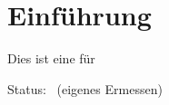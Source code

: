 \documentclass[12pt,a4paper,ngerman,numbers=noenddot,toc=listof]{scrartcl}	%
\begin{document}
\thispagestyle{empty}

\newpage{}
\tableofcontents	%

\setcounter{headpages}{\value{page}}\newpage{}
\section{Einführung}
\label{sec:einleitung}
Dies ist eine \TITEL für \SUBJECT{}

\setcounter{sectionsV}{\value{section}}		%
\appendix	%

\vfill
\printURLlong
\printlicense
\printendsignature
  \newpage\Statistiken
  Status:~ (eigenes Ermessen)
  \newpage
  \begin{sourcefiletable}{1}
  \end{sourcefiletable}
\end{document}
